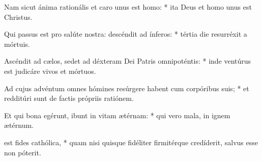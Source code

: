 {Nam sicut ánima rationális et caro unus est homo: * ita Deus et homo unus est Christus.\par
Qui passus est pro salúte nostra: descéndit ad ínferos: * tértia die resurréxit a mórtuis.\par
Ascéndit ad c{\ae}los, sedet ad déxteram Dei Patris omnipoténtis: * inde ventúrus est judicáre vivos et mórtuos.\par
Ad cujus advéntum omnes hómines resúrgere habent cum corpóribus suis; * et redditúri sunt de factis própriis ratiónem.\par
Et qui bona egérunt, ibunt in vitam {\ae}térnam: * qui vero mala, in ignem {\ae}térnum.
\par
{} est fides cathólica, * quam nisi quisque fidéliter firmitérque credíderit, salvus esse non póterit.\par
{}
}
